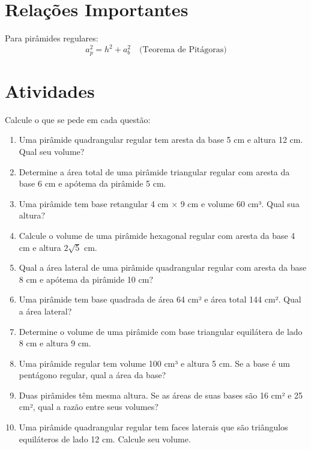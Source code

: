 \documentclass[11pt]{article}
\begin{document}
\begin{multicols}{2}
\section*{Relações Importantes}
Para pirâmides regulares:
\[
a_p^2 = h^2 + a_b^2 \quad \text{(Teorema de Pitágoras)}
\]

\section*{Atividades}
Calcule o que se pede em cada questão:

\begin{enumerate}[leftmargin=*]
    \item Uma pirâmide quadrangular regular tem aresta da base 5 cm e altura 12 cm. Qual seu volume?
    
    \item Determine a área total de uma pirâmide triangular regular com aresta da base 6 cm e apótema da pirâmide 5 cm.
    
    \item Uma pirâmide tem base retangular 4 cm × 9 cm e volume 60 cm³. Qual sua altura?
    
    \item Calcule o volume de uma pirâmide hexagonal regular com aresta da base 4 cm e altura $2\sqrt{5}$ cm.
    
    \item Qual a área lateral de uma pirâmide quadrangular regular com aresta da base 8 cm e apótema da pirâmide 10 cm?
    
    \item Uma pirâmide tem base quadrada de área 64 cm² e área total 144 cm². Qual a área lateral?
    
    \item Determine o volume de uma pirâmide com base triangular equilátera de lado 8 cm e altura 9 cm.
    
    \item Uma pirâmide regular tem volume 100 cm³ e altura 5 cm. Se a base é um pentágono regular, qual a área da base?
    
    \item Duas pirâmides têm mesma altura. Se as áreas de suas bases são 16 cm² e 25 cm², qual a razão entre seus volumes?
    
    \item Uma pirâmide quadrangular regular tem faces laterais que são triângulos equiláteros de lado 12 cm. Calcule seu volume.
\end{enumerate}


\end{multicols}
\end{document}
